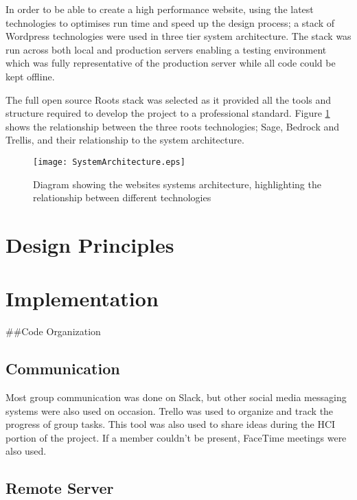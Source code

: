 In order to be able to create a high performance website, using the
latest technologies to optimises run time and speed up the design
process; a stack of Wordpress technologies were used in three tier
system architecture. The stack was run across both local and production
servers enabling a testing environment which was fully representative of
the production server while all code could be kept offline.

The full open source Roots stack \cite{rootsweb} was selected as it
provided all the tools and structure required to develop the project to
a professional standard. Figure \ref{systemarchitecture} shows the
relationship between the three roots technologies; Sage, Bedrock and
Trellis, and their relationship to the system architecture.

\begin{figure}[H]
\centering
\texttt{[image: SystemArchitecture.eps]}
\caption{Diagram showing the websites systems architecture, highlighting the relationship between different technologies}
\label{systemarchitecture}
\end{figure}

\newpage

\hypertarget{design-principles}{%
\section{Design Principles}\label{design-principles}}

\hypertarget{implementation}{%
\section{Implementation}\label{implementation}}

\#\#Code Organization

\hypertarget{communication}{%
\subsection{Communication}\label{communication}}

Most group communication was done on Slack, but other social media
messaging systems were also used on occasion. Trello was used to
organize and track the progress of group tasks. This tool was also used
to share ideas during the HCI portion of the project. If a member
couldn't be present, FaceTime meetings were also used.

\hypertarget{remote-server}{%
\subsection{Remote Server}\label{remote-server}}

